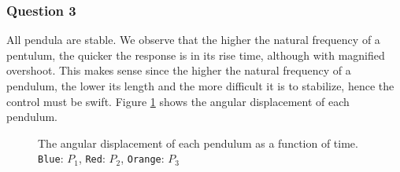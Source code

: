 \subsubsection{Question 3}

All pendula are stable. We observe that the higher the natural frequency of a
pentulum, the quicker the response is in its rise time, although with magnified
overshoot. This makes sense since the higher the natural frequency of a
pendulum, the lower its length and the more difficult it is to stabilize, hence
the control must be swift. Figure \ref{fig:01.3} shows the angular displacement
of each pendulum.

\begin{figure}[H]\centering
  \scalebox{1}{}
  \caption{The angular displacement of each pendulum as a function of time.
    \texttt{Blue}: $P_1$, \texttt{Red}: $P_2$, \texttt{Orange}: $P_3$}
  \label{fig:01.3}
\end{figure}
